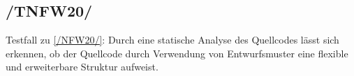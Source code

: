 \subsection*{/TNFW20/}

\label{/TNFW20/} Testfall zu \ref{/NFW20/}: Durch eine \gls{statische Analyse} des \Gls{Quellcode}s lässt sich erkennen, ob der \Gls{Quellcode} durch Verwendung von \Gls{Entwurfsmuster} eine flexible und erweiterbare Struktur aufweist.
